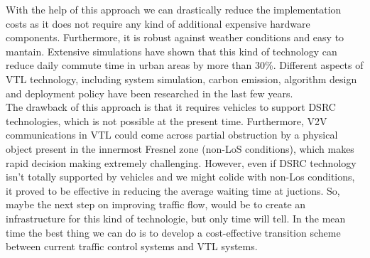 \documentclass[17pt]{article}
\begin{document}
\indent \indent
With the help of this approach we can drastically reduce
the implementation costs as it does not require any kind of additional
expensive hardware components. Furthermore, it is robust against weather conditions
and easy to mantain. Extensive simulations have shown that this kind
of technology can reduce daily commute time in urban areas by more than 30\%.
Different aspects of VTL technology, including system simulation, carbon
emission, algorithm design and deployment policy have been researched in the
last few years. \cite{Neudecker2012}\\
\indent \indent
The drawback of this approach is that it requires vehicles
to support DSRC technologies, which is not possible at the present time.
Furthermore, V2V communications in VTL could come across partial obstruction by
a physical object present in the innermost Fresnel zone (non-LoS conditions),
which makes rapid decision making extremely challenging. However, even if DSRC
technology isn't totally supported by vehicles and we might colide with non-Los
conditions, it proved to be effective in reducing the average waiting time at
juctions. So, maybe the next step on improving traffic flow, would be to create
an infrastructure for this kind of technologie, but only time will tell. In the mean
time the best thing we can do is to develop a cost-effective transition scheme
between current traffic control systems and VTL systems.

\pagebreak



\end{document}
